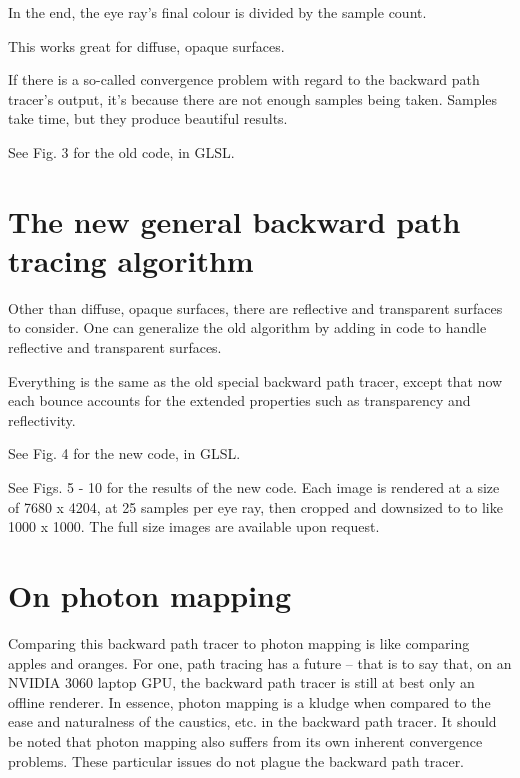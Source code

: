 \documentclass[12pt]{article}
\begin{document}
In the end, the eye ray's final colour is divided by the sample count.

This works great for diffuse, opaque surfaces.

If there is a so-called convergence problem with regard to the backward path tracer's output, it's because there are not enough samples being taken.
Samples take time, but they produce beautiful results.

See Fig. 3 for the old code, in GLSL.





\section{The new general backward path tracing algorithm}

Other than diffuse, opaque surfaces, there are reflective and transparent surfaces to consider.
One can generalize the old algorithm by adding in code to handle reflective and transparent surfaces.

Everything is the same as the old special backward path tracer, except that now each bounce accounts for the extended properties such as transparency and reflectivity.

See Fig. 4 for the new code, in GLSL.

See Figs. 5 - 10 for the results of the new code.
Each image is rendered at a size of 7680 x 4204, at 25 samples per eye ray, then cropped and downsized to to like 1000 x 1000.
The full size images are available upon request.






\section{On photon mapping}

Comparing this backward path tracer to photon mapping \cite{jensen, john} is like comparing apples and oranges.
For one, path tracing has a future -- that is to say that, on an NVIDIA 3060 laptop GPU, the backward path tracer is still at best only an offline renderer.
In essence, photon mapping is a kludge when compared to the ease and naturalness of the caustics, etc. in the backward path tracer.
It should be noted that photon mapping also suffers from its own inherent convergence problems.
These particular issues do not plague the backward path tracer.
\end{document}
